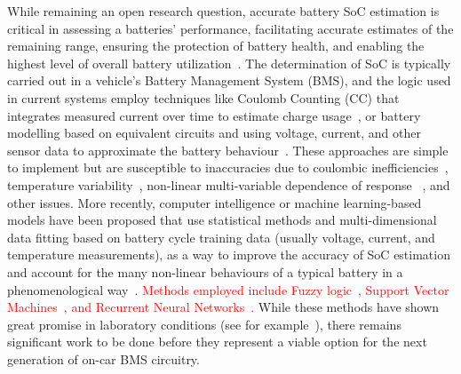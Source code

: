 %
%
While remaining an open research question, accurate battery SoC estimation is critical in assessing a batteries' performance, facilitating accurate estimates of the remaining range, ensuring the protection of battery health, and enabling the highest level of overall battery utilization~\cite{yamin_embedded_2014}.
The determination of SoC is typically carried out in a vehicle's Battery Management System (BMS), and the logic used in current systems employ techniques like Coulomb Counting (CC) that integrates measured current over time to estimate charge usage~\cite{robust_SoC}, or battery modelling based on equivalent circuits and using voltage, current, and other sensor data to approximate the battery behaviour~\cite{6953745,ng_enhanced_2009,robust_SoC}.
These approaches are simple to implement but are susceptible to inaccuracies due to coulombic inefficiencies~\cite{Smith_2010}, temperature variability~\cite{xing_state_2014}, non-linear multi-variable dependence of response ~\cite{hansen_support_2005,anton_battery_2013,he_state_2014}, and other issues.
More recently, computer intelligence or machine learning-based models have been proposed that use statistical methods and multi-dimensional data fitting based on battery cycle training data (usually voltage, current, and temperature measurements), as a way to improve the accuracy of SoC estimation and account for the many non-linear behaviours of a typical battery in a phenomenological way~\cite{hansen_support_2005,anton_battery_2013,he_state_2014}.
\textcolor{red}{Methods employed include Fuzzy logic~\cite{malkhandi_fuzzy_2006}, Support Vector Machines~\cite{hansen_support_2005, anton_battery_2013}, and Recurrent Neural Networks~\cite{song_lithium-ion_2018,Chemali2017,mamo_long_2020,jiao_gru-rnn_2020,xiao_accurate_2019,javid_adaptive_2020,zhang_deep_2020}.}
While these methods have shown great promise in laboratory conditions (see for example~\cite{jiao_gru-rnn_2020}), there remains significant work to be done before they represent a viable option for the next generation of on-car BMS circuitry.

